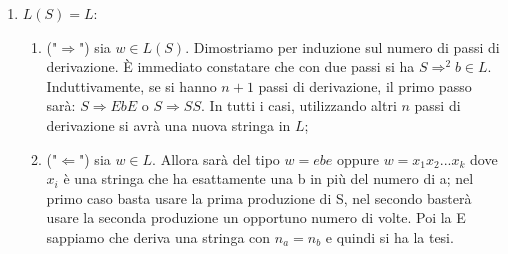 \documentclass[a4paper,11pt]{article}
\begin{document}
\begin{enumerate}
\begin{enumerate}
\begin{enumerate}
        \end{enumerate}
        \item $L(S)=L$:
        \begin{enumerate}
            \item ("$\Rightarrow$") sia $w\in L(S)$. Dimostriamo per induzione sul numero di passi di derivazione. È immediato constatare che con due passi si ha $S\Rightarrow ^2 b  \in L$.\\Induttivamente, se si hanno $n+1$ passi di derivazione, il primo passo sarà: $S\Rightarrow EbE$ o $S\Rightarrow SS$. In tutti i casi, utilizzando altri $n$ passi di derivazione si avrà una nuova stringa in $L$;
            \item ("$\Leftarrow$") sia $w\in L$. Allora sarà del tipo $w=ebe$ oppure $w=x_1x_2...x_k$ dove $x_i$ è una stringa che ha esattamente una b in più del numero di a; nel primo caso basta usare la prima produzione di S, nel secondo basterà usare la seconda produzione un opportuno numero di volte. Poi la E sappiamo che deriva una stringa con $n_a=n_b$ e quindi si ha la tesi.
        \end{enumerate}
    \end{enumerate}
    

\end{enumerate}
\end{document}
